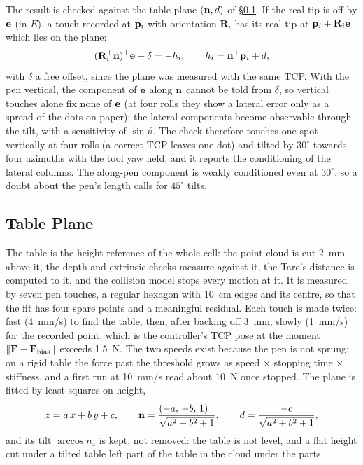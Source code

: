 The result is checked against the table plane $(\mathbf{n},d)$ of \S\ref{sec:cal_table}. If the
real tip is off by $\mathbf{e}$ (in $E$), a touch recorded at $\mathbf{p}_i$ with orientation
$\mathbf{R}_i$ has its real tip at $\mathbf{p}_i+\mathbf{R}_i\mathbf{e}$, which lies on the plane:
\begin{equation}
(\mathbf{R}_i^{\top}\mathbf{n})^{\top}\mathbf{e}+\delta=-h_i,
\qquad h_i=\mathbf{n}^{\top}\mathbf{p}_i+d,
\label{eq:tcp_check}
\end{equation}
with $\delta$ a free offset, since the plane was measured with the same TCP. With the pen vertical,
the component of $\mathbf{e}$ along $\mathbf{n}$ cannot be told from $\delta$, so vertical touches alone
fix none of $\mathbf{e}$ (at four rolls they show a lateral error only as a spread of the dots on
paper); the lateral components become observable through the tilt, with a sensitivity of
$\sin\vartheta$. The check therefore touches one
spot vertically at four rolls (a correct TCP leaves one dot) and tilted by $30^\circ$ towards
four azimuths with the tool yaw held, and it reports the conditioning of the lateral columns.
The along-pen component is weakly conditioned even at $30^\circ$, so a doubt about the pen's
length calls for $45^\circ$ tilts.

\subsection{Table Plane}
\label{sec:cal_table}
The table is the height reference of the whole cell: the point cloud is cut 2~mm above it, the
depth and extrinsic checks measure against it, the Tare's distance is computed to it, and the
collision model stops every motion at it. It is measured by seven pen touches, a regular hexagon
with 10~cm edges and its centre, so that the fit has four spare points and a meaningful residual.
Each touch is made twice: fast (4~mm/s) to find the table, then, after backing off 3~mm, slowly
(1~mm/s) for the recorded point, which is the controller's TCP pose at the moment
$\left\lVert\mathbf{F}-\mathbf{F}_{\mathrm{bias}}\right\rVert$ exceeds 1.5~N. The two speeds exist because the pen is
not sprung: on a rigid table the force past the threshold grows as speed $\times$ stopping
time $\times$ stiffness, and a first run at 10~mm/s read about 10~N once stopped. The plane is
fitted by least squares on height,
\begin{equation}
z=a\,x+b\,y+c,\qquad
\mathbf{n}=\frac{(-a,\,-b,\,1)^{\top}}{\sqrt{a^2+b^2+1}},\qquad
d=\frac{-c}{\sqrt{a^2+b^2+1}},
\label{eq:table_plane}
\end{equation}
and its tilt $\arccos n_z$ is kept, not removed: the table is not level, and a flat height cut
under a tilted table left part of the table in the cloud under the parts.


